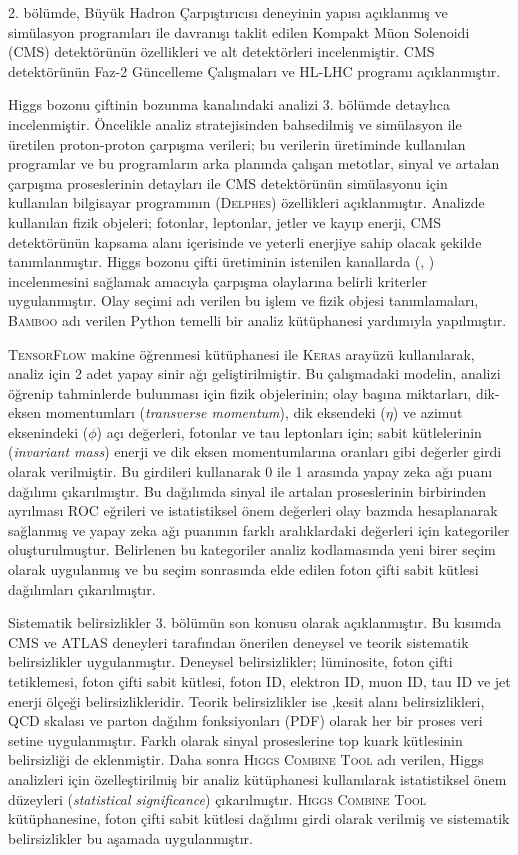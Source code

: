 2. bölümde, Büyük Hadron Çarpıştırıcısı deneyinin yapısı açıklanmış ve simülasyon programları ile davranışı taklit edilen Kompakt Müon Solenoidi (CMS) detektörünün özellikleri ve alt detektörleri incelenmiştir. CMS detektörünün Faz-2 Güncelleme Çalışmaları ve HL-LHC programı açıklanmıştır.

Higgs bozonu çiftinin \wwgg bozunma kanalındaki analizi  3. bölümde detaylıca incelenmiştir. Öncelikle analiz stratejisinden bahsedilmiş ve simülasyon ile üretilen proton-proton çarpışma verileri; bu verilerin üretiminde kullanılan programlar ve bu programların arka planında çalışan metotlar, sinyal ve artalan çarpışma proseslerinin detayları ile CMS detektörünün simülasyonu için kullanılan bilgisayar programının (\textsc{Delphes}) özellikleri açıklanmıştır. Analizde kullanılan fizik objeleri; fotonlar, leptonlar, jetler ve kayıp enerji, CMS detektörünün kapsama alanı içerisinde ve yeterli enerjiye sahip olacak şekilde tanımlanmıştır. Higgs bozonu çifti üretiminin istenilen kanallarda (\wwgg, \ttgg) incelenmesini sağlamak amacıyla çarpışma olaylarına belirli kriterler uygulanmıştır. Olay seçimi adı verilen bu işlem ve fizik objesi tanımlamaları, \textsc{Bamboo} adı verilen Python temelli bir analiz kütüphanesi yardımıyla yapılmıştır.

\textsc{TensorFlow} makine öğrenmesi kütüphanesi ile \textsc{Keras} arayüzü kullanılarak, analiz için 2 adet yapay sinir ağı geliştirilmiştir. Bu çalışmadaki modelin, analizi öğrenip tahminlerde bulunması için fizik objelerinin; olay başına miktarları, dik-eksen momentumları (\emph{transverse momentum}), dik eksendeki ($\eta$) ve azimut eksenindeki ($\phi$) açı değerleri, fotonlar ve tau leptonları için; sabit kütlelerinin (\emph{invariant mass}) enerji ve dik eksen momentumlarına oranları gibi değerler girdi olarak verilmiştir. Bu girdileri kullanarak 0 ile 1 arasında yapay zeka ağı puanı dağılımı çıkarılmıştır. Bu dağılımda sinyal ile artalan proseslerinin birbirinden ayrılması ROC eğrileri ve istatistiksel önem değerleri olay bazında hesaplanarak sağlanmış ve yapay zeka ağı puanının farklı aralıklardaki değerleri için kategoriler oluşturulmuştur. Belirlenen bu kategoriler analiz kodlamasında yeni birer seçim olarak uygulanmış ve bu seçim sonrasında elde edilen foton çifti sabit kütlesi dağılımları çıkarılmıştır.

Sistematik belirsizlikler 3. bölümün son konusu olarak açıklanmıştır. Bu kısımda CMS ve ATLAS deneyleri tarafından önerilen deneysel ve teorik sistematik belirsizlikler uygulanmıştır. Deneysel belirsizlikler; lüminosite, foton çifti tetiklemesi, foton çifti sabit kütlesi, foton ID, elektron ID, muon ID, tau ID ve jet enerji ölçeği belirsizlikleridir. Teorik belirsizlikler ise ,kesit alanı belirsizlikleri, QCD skalası ve parton dağılım fonksiyonları (PDF) olarak her bir proses veri setine uygulanmıştır. Farklı olarak sinyal proseslerine top kuark kütlesinin belirsizliği de eklenmiştir. Daha sonra \textsc{Higgs Combine Tool} adı verilen, Higgs analizleri için özelleştirilmiş bir analiz kütüphanesi kullanılarak istatistiksel önem düzeyleri (\emph{statistical significance}) çıkarılmıştır. \textsc{Higgs Combine Tool} kütüphanesine, foton çifti sabit kütlesi dağılımı girdi olarak verilmiş ve sistematik belirsizlikler bu aşamada uygulanmıştır.

